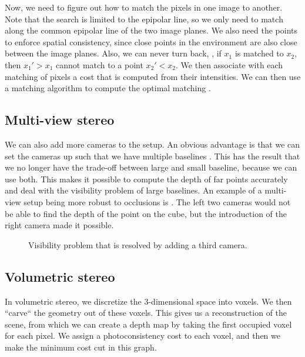 Now, we need to figure out how to match the pixels in one image to another.
Note that the search is limited to the epipolar line, so we only need to match
along the common epipolar line of the two image planes. We also need the points
to enforce spatial consistency, since close points in the environment are also
close between the image planes. Also, we can never turn back, \ie, if $x_1$ is
matched to $x_2$, then $x_1' > x_1$ cannot match to a point $x_2' < x_2$. We
then associate with each matching of pixels a cost that is computed from their
intensities. We can then use a matching algorithm to compute the optimal
matching \citep{baker1981depth}.

\subsection{Multi-view stereo}

We can also add more cameras to the setup. An obvious advantage is that we can
set the cameras up such that we have multiple baselines
\citep{okutomi1993multiple}. This has the result that we no longer have the
trade-off between large and small baseline, because we can use both. This makes
it possible to compute the depth of far points accurately and deal with the
visibility problem of large baselines. An example of a multi-view setup being
more robust to occlusions is . The left two
cameras would not be able to find the depth of the point on the cube, but the
introduction of the right camera made it possible.

\begin{figure}
    \centering
    \caption{Visibility problem that is resolved by adding a third camera.}
    \label{fig:visibility-problem}
\end{figure}

\subsection{Volumetric stereo}

In volumetric stereo, we discretize the 3-dimensional space into
voxels. We then ``carve``
the geometry out of these voxels. This gives us a reconstruction of the scene,
from which we can create a depth map by taking the first occupied voxel for
each pixel. We assign a photoconsistency cost to each voxel, and then we make
the minimum cost cut in this graph.


